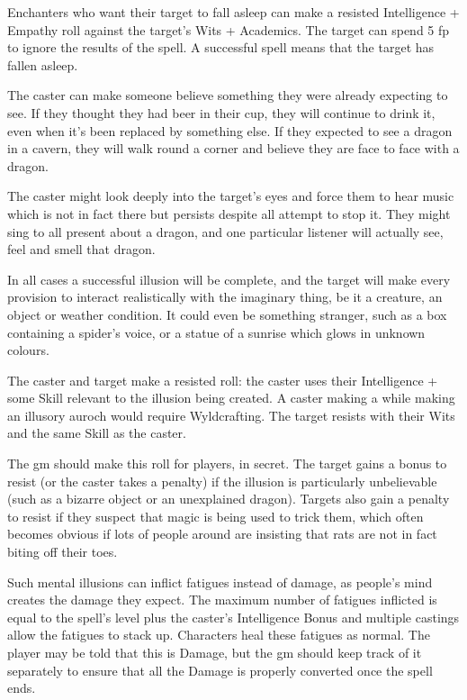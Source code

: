 \begin{multicols}{2}
\spelllevel


Enchanters who want their target to fall asleep can make a resisted Intelligence + Empathy roll against the target's Wits + Academics.
The target can spend 5 \gls{fp} to ignore the results of the spell. A successful spell means that the target has fallen asleep.


The caster can make someone believe something they were already expecting to see.
If they thought they had beer in their cup, they will continue to drink it, even when it's been replaced by something else.
If they expected to see a dragon in a cavern, they will walk round a corner and believe they are face to face with a dragon.

The caster might look deeply into the target's eyes and force them to hear music which is not in fact there but persists despite all attempt to stop it. They might sing to all present about a dragon, and one particular listener will actually see, feel and smell that dragon.

In all cases a successful illusion will be complete, and the target will make every provision to interact realistically with the imaginary thing, be it a creature, an object or weather condition. It could even be something stranger, such as a box containing a spider's voice, or a statue of a sunrise which glows in unknown colours.

The caster and target make a resisted roll: the caster uses their Intelligence + some Skill relevant to the illusion being created.
A caster making a 
\iftoggle{aif}%
{dragon might use Xenomology,}%
{trebuchet might use Crafts,}
while making an illusory auroch would require Wyldcrafting.
The target resists with their Wits and the same Skill as the caster.

The \gls{gm} should make this roll for players, in secret. The target gains a bonus to resist (or the caster takes a penalty) if the illusion is particularly unbelievable (such as a bizarre object or an unexplained dragon). Targets also gain a penalty to resist if they suspect that magic is being used to trick them, which often becomes obvious if lots of people around are insisting that rats are not in fact biting off their toes.

Such mental illusions can inflict \glspl{fatigue} instead of damage, as people's mind creates the damage they expect.
The maximum number of \glspl{fatigue} inflicted is equal to the spell's level plus the caster's Intelligence Bonus and multiple castings allow the \glspl{fatigue} to stack up.
Characters heal these \glspl{fatigue} as normal.
The player may be told that this is Damage, but the \gls{gm} should keep track of it separately to ensure that all the Damage is properly converted once the spell ends.


\end{multicols}
